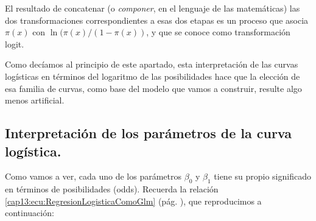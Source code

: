 El resultado de concatenar (o {\em componer}, en el lenguaje de las matemáticas) las dos transformaciones correspondientes a esas dos etapas  es un proceso que asocia $\pi(x)$ con $\ln(\pi(x)/(1-\pi(x))$, y que se conoce como \textsf{transformación logit}.
\begin{center}
    \end{center}
Como decíamos al principio de este apartado, esta interpretación de las curvas logísticas en términos del logaritmo de las posibilidades hace que la elección de esa familia de curvas, como base del modelo que vamos a construir, resulte algo menos artificial.

\subsection{Interpretaci\'on de los parámetros de la curva log\'istica.}
\label{cap13:subsection:interpretacionparametros}



Como vamos a ver, cada uno de los parámetros $\beta_0$ y $\beta_1$ tiene su propio significado en términos de
posibilidades (odds). Recuerda la relaci\'on
\ref{cap13:ecu:RegresionLogisticaComoGlm} (pág. \pageref{cap13:ecu:RegresionLogisticaComoGlm}), que reproducimos a continuaci\'on:

